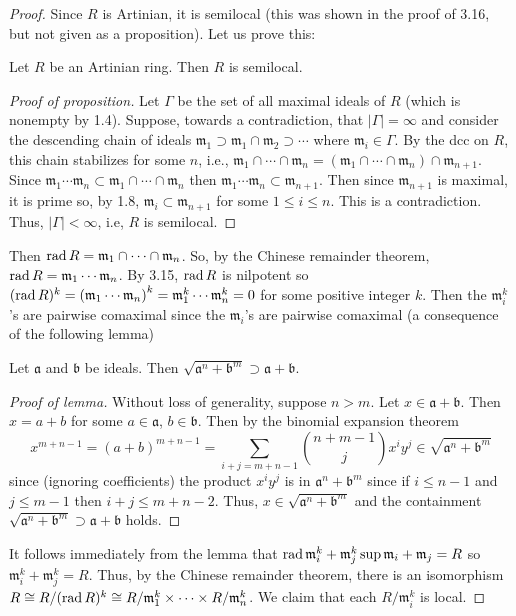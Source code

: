 \begin{proof}
Since $R$ is Artinian, it is semilocal (this was shown in the proof
of 3.16, but not given as a proposition). Let us prove this:
\begin{proposition*}
Let $R$ be an Artinian ring. Then $R$ is semilocal.
\end{proposition*}
\begin{proof}[Proof of proposition]
\renewcommand\qedsymbol{$\clubsuit$}
Let $\Gamma$ be the set of all maximal ideals of $R$ (which is
nonempty by 1.4). Suppose, towards a contradiction, that
$|\Gamma|=\infty$ and consider the descending chain of ideals
$\mathfrak{m}_1\supset\mathfrak{m}_1\cap\mathfrak{m}_2\supset\cdots$
where $\mathfrak{m}_i\in\Gamma$. By the dcc on $R$, this chain
stabilizes for some $n$, i.e.,
$\mathfrak{m}_1\cap\cdots\cap\mathfrak{m}_n=\left(\mathfrak{m}_1\cap\cdots\cap\mathfrak{m}_n\right)\cap\mathfrak{m}_{n+1}$. Since
$\mathfrak{m}_1\cdots\mathfrak{m}_n\subset\mathfrak{m}_1\cap\cdots\cap\mathfrak{m}_n$
then
$\mathfrak{m}_1\cdots\mathfrak{m}_n\subset\mathfrak{m}_{n+1}$. Then
since $\mathfrak{m}_{n+1}$ is maximal, it is prime so, by 1.8,
$\mathfrak{m}_i\subset\mathfrak{m}_{n+1}$ for some $1\leq i\leq
n$. This is a contradiction. Thus, $|\Gamma|<\infty$, i.e, $R$ is
semilocal.
\end{proof}
Then $\operatorname{rad} R=\mathfrak{m}_1\cap\cdots\cap\mathfrak{m}_n$. So, by
the Chinese remainder theorem, $\operatorname{rad}
R=\mathfrak{m}_1\cdots\mathfrak{m}_n$. By 3.15, $\operatorname{rad} R$ is
nilpotent so $(\operatorname{rad}
R)^k=\left(\mathfrak{m}_1\cdots\mathfrak{m}_n\right)^k=\mathfrak{m}_1^k\cdots\mathfrak{m}_n^k=0$
for some positive integer $k$. Then the $\mathfrak{m}_i^k$'s are
pairwise comaximal since the $\mathfrak{m}_i$'s are pairwise
comaximal (a consequence of the following lemma)
\begin{lemma*}
Let $\mathfrak{a}$ and $\mathfrak{b}$ be ideals. Then
$\sqrt{\mathfrak{a}^n+\mathfrak{b}^m}\supset\mathfrak{a}+\mathfrak{b}$.
\end{lemma*}
\begin{proof}[Proof of lemma]
\renewcommand\qedsymbol{$\clubsuit$}
Without loss of generality, suppose $n>m$. Let
$x\in\mathfrak{a}+\mathfrak{b}$. Then $x=a+b$ for some
$a\in\mathfrak{a}$, $b\in\mathfrak{b}$. Then by the binomial
expansion theorem
\[
x^{m+n-1}=(a+b)^{m+n-1}=\sum_{i+j=m+n-1}\binom{n+m-1}{j}x^iy^j\in\sqrt{\mathfrak{a}^n+\mathfrak{b}^m}
\]
since (ignoring coefficients) the product $x^iy^j$ is in
$\mathfrak{a}^n+\mathfrak{b}^m$ since if $i\leq n-1$ and $j\leq
m-1$ then $i+j\leq m+n-2$. Thus,
$x\in\sqrt{\mathfrak{a}^n+\mathfrak{b}^m}$ and the containment
$\sqrt{\mathfrak{a}^n+\mathfrak{b}^m}\supset\mathfrak{a}+\mathfrak{b}$
holds.
\end{proof}
It follows immediately from the lemma that
$\operatorname{rad}{\mathfrak{m}_i^k+\mathfrak{m}_j^k}\sup\mathfrak{m}_i+\mathfrak{m}_j=R$
so $\mathfrak{m}_i^k+\mathfrak{m}_j^k=R$. Thus, by the Chinese
remainder theorem, there is an isomorphism $R\cong R/(\operatorname{rad}
R)^k\cong R/\mathfrak{m}_1^k\times\cdots\times
R/\mathfrak{m}_n^k$. We claim that each $R/\mathfrak{m}_i^k$ is
local.


\end{proof}
